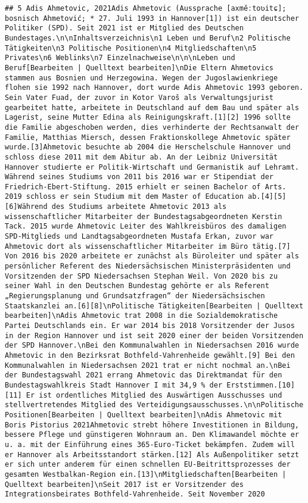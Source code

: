 \documentclass[
]{article}
\begin{document}
\begin{verbatim}
## 5 Adis Ahmetovic, 2021Adis Ahmetovic (Aussprache [axměːtoʋitɕ]; bosnisch Ahmetović; * 27. Juli 1993 in Hannover[1]) ist ein deutscher Politiker (SPD). Seit 2021 ist er Mitglied des Deutschen Bundestages.\n\nInhaltsverzeichnis\n1 Leben und Beruf\n2 Politische Tätigkeiten\n3 Politische Positionen\n4 Mitgliedschaften\n5 Privates\n6 Weblinks\n7 Einzelnachweise\n\n\nLeben und Beruf[Bearbeiten | Quelltext bearbeiten]\nDie Eltern Ahmetovics stammen aus Bosnien und Herzegowina. Wegen der Jugoslawienkriege flohen sie 1992 nach Hannover, dort wurde Adis Ahmetovic 1993 geboren. Sein Vater Fuad, der zuvor in Kotor Varoš als Verwaltungsjurist gearbeitet hatte, arbeitete in Deutschland auf dem Bau und später als Lagerist, seine Mutter Edina als Reinigungskraft.[1][2] 1996 sollte die Familie abgeschoben werden, dies verhinderte der Rechtsanwalt der Familie, Matthias Miersch, dessen Fraktionskollege Ahmetovic später wurde.[3]Ahmetovic besuchte ab 2004 die Herschelschule Hannover und schloss diese 2011 mit dem Abitur ab. An der Leibniz Universität Hannover studierte er Politik-Wirtschaft und Germanistik auf Lehramt. Während seines Studiums von 2011 bis 2016 war er Stipendiat der Friedrich-Ebert-Stiftung. 2015 erhielt er seinen Bachelor of Arts. 2019 schloss er sein Studium mit dem Master of Education ab.[4][5][6]Während des Studiums arbeitete Ahmetovic 2013 als wissenschaftlicher Mitarbeiter der Bundestagsabgeordneten Kerstin Tack. 2015 wurde Ahmetovic Leiter des Wahlkreisbüros des damaligen SPD-Mitglieds und Landtagsabgeordneten Mustafa Erkan, zuvor war Ahmetovic dort als wissenschaftlicher Mitarbeiter im Büro tätig.[7] Von 2016 bis 2020 arbeitete er zunächst als Büroleiter und später als persönlicher Referent des Niedersächsischen Ministerpräsidenten und Vorsitzenden der SPD Niedersachsen Stephan Weil. Von 2020 bis zu seiner Wahl in den Deutschen Bundestag gehörte er als Referent „Regierungsplanung und Grundsatzfragen“ der Niedersächsischen Staatskanzlei an.[6][8]\nPolitische Tätigkeiten[Bearbeiten | Quelltext bearbeiten]\nAdis Ahmetovic trat 2008 in die Sozialdemokratische Partei Deutschlands ein. Er war 2014 bis 2018 Vorsitzender der Jusos in der Region Hannover und ist seit 2020 einer der beiden Vorsitzenden der SPD Hannover.\nBei den Kommunalwahlen in Niedersachsen 2016 wurde Ahmetovic in den Bezirksrat Bothfeld-Vahrenheide gewählt.[9] Bei den Kommunalwahlen in Niedersachsen 2021 trat er nicht nochmal an.\nBei der Bundestagswahl 2021 errang Ahmetovic das Direktmandat für den Bundestagswahlkreis Stadt Hannover I mit 34,9 % der Erststimmen.[10][11] Er ist ordentliches Mitglied des Auswärtigen Ausschusses und stellvertretendes Mitglied des Verteidigungsausschusses.\n\nPolitische Positionen[Bearbeiten | Quelltext bearbeiten]\nAdis Ahmetovic mit Boris Pistorius 2021Ahmetovic strebt höhere Investitionen in Bildung, bessere Pflege und günstigeren Wohnraum an. Den Klimawandel möchte er u. a. mit der Einführung eines 365-Euro-Ticket bekämpfen. Zudem will er Hannover als Arbeitsstandort stärken.[12] Als Außenpolitiker setzt er sich unter anderem für einen schnellen EU-Beitrittsprozesses der gesamten Westbalkan-Region ein.[13]\nMitgliedschaften[Bearbeiten | Quelltext bearbeiten]\nSeit 2017 ist er Vorsitzender des Integrationsbeirates Bothfeld-Vahrenheide. Seit November 2020 
\end{verbatim}
\end{document}
